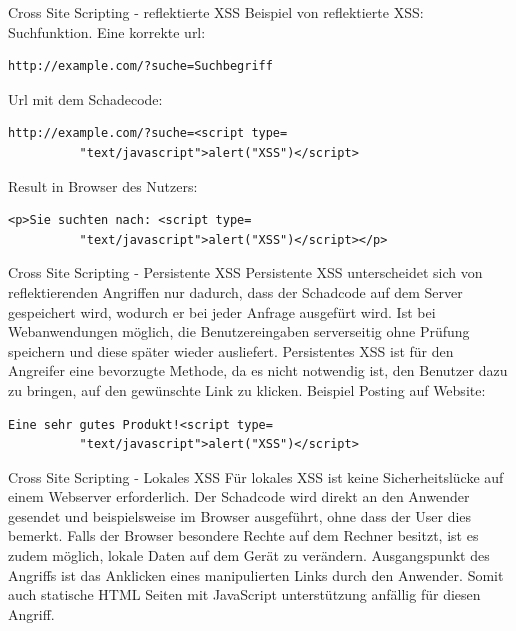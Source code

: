 \documentclass[10pt]{beamer}
\begin{document}
\begin{frame}[fragile]{Cross Site Scripting - reflektierte XSS}
  Beispiel von reflektierte XSS: Suchfunktion.
  \newline
  Eine korrekte url:
  \begin{lstlisting}[style=CStyle]
    http://example.com/?suche=Suchbegriff
  \end{lstlisting}
  Url mit dem Schadecode:
  \begin{lstlisting}[style=CStyle]
    http://example.com/?suche=<script type=
          "text/javascript">alert("XSS")</script>
  \end{lstlisting}
  Result in Browser des Nutzers:
  \begin{lstlisting}[style=CStyle]
    <p>Sie suchten nach: <script type=
          "text/javascript">alert("XSS")</script></p>
  \end{lstlisting}
\end{frame}

\begin{frame}[fragile]{Cross Site Scripting - Persistente XSS}
  Persistente XSS unterscheidet sich von reflektierenden Angriffen nur dadurch, dass der Schadcode auf dem Server gespeichert wird, wodurch er bei jeder Anfrage ausgef\"urt wird.
  Ist bei Webanwendungen m\"oglich, die Benutzereingaben serverseitig ohne Pr\"ufung speichern und diese sp\"ater wieder ausliefert. Persistentes XSS ist f\"ur den Angreifer eine bevorzugte Methode, da es nicht notwendig ist, den Benutzer dazu zu bringen, auf den gew\"unschte Link zu klicken.
  \newline
  Beispiel Posting auf Website:
  \begin{lstlisting}[style=CStyle]
    Eine sehr gutes Produkt!<script type=
          "text/javascript">alert("XSS")</script>
  \end{lstlisting}
\end{frame}

\begin{frame}[fragile]{Cross Site Scripting - Lokales XSS}
  F\"ur lokales XSS ist keine Sicherheitsl\"ucke auf einem Webserver erforderlich. Der Schadcode wird direkt an den Anwender gesendet und beispielsweise im Browser ausgeführt, ohne dass der User dies bemerkt.
  \newline
  Falls der Browser besondere Rechte auf dem Rechner besitzt, ist es zudem möglich, lokale Daten auf dem Gerät zu verändern.
  \newline
  Ausgangspunkt des Angriffs ist das Anklicken eines manipulierten Links durch den Anwender.
  Somit auch statische HTML Seiten mit JavaScript unterst\"utzung anf\"allig f\"ur diesen Angriff.
\end{frame}
\end{document}
